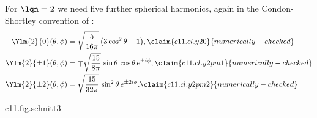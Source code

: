 \begin{vertiefung}[id=c11.v3,
    titel={The wave functions for $\nqn = 3$},
    wozu={The Core text writes out the states up to $\nqn = 2$. Here are the nine states
      for $\nqn = 3$, among them the first d states.},
    voraussetzung={Core~\ref{c11.s5}; the general formula of Deeper block~\ref{c11.v2}
      helps but is not needed. Not needed for Sections~\ref{c11.s6} and \ref{c11.s7}.},
    zurueck={With growing $\nqn$ nodes are added and the functions reach further out;
      the construction, radial function times spherical harmonic, does not change.}]
  For $\lqn = 2$ we need five further spherical harmonics, again in the Condon-Shortley
  convention of :
  \begin{align}
    \Ylm{2}{0}(\theta, \phi) &= \sqrt{\frac{5}{16\pi}}\,\bigl(3\cos^2\theta - 1\bigr),
      \label{c11.eq.y20}\claim{c11.cl.y20}{numerically-checked} \\
    \Ylm{2}{\pm 1}(\theta, \phi) &= \mp\sqrt{\frac{15}{8\pi}}\,\sin\theta\,\cos\theta\,e^{\pm i\phi},
      \label{c11.eq.y2pm1}\claim{c11.cl.y2pm1}{numerically-checked} \\
    \Ylm{2}{\pm 2}(\theta, \phi) &= \sqrt{\frac{15}{32\pi}}\,\sin^2\theta\,e^{\pm 2i\phi}.
      \label{c11.eq.y2pm2}\claim{c11.cl.y2pm2}{numerically-checked}
  \end{align}

  \begin{tpcfigure}{c11.fig.schnitt3}
    \caption{The density $\abs{\psi}^2$ of the relative coordinate for the d states with $\nqn = 3$, as a section through the plane $y = 0$ and for $\Znuc = 1$, in the same representation as Figure~\ref{c11.fig.schnitt}; all three panels use a common linear grey scale. The axes are components of $\posRel = \posE - \posP$.}
  \end{tpcfigure}


\end{vertiefung}
